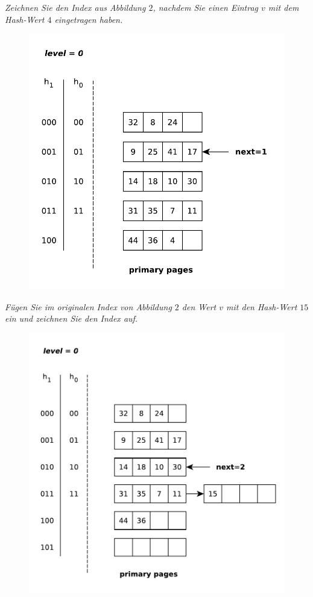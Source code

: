 \documentclass{uni_tue_template}
\begin{document}
  \item \emph{Zeichnen Sie den Index aus Abbildung $2$, nachdem Sie einen Eintrag $v$ mit dem Hash-Wert $4$ eingetragen haben.}
  \begin{figure}[h!]
    \centering
    \includegraphics[scale=0.7]{graphml/02_2.pdf}
  \end{figure}
  \newpage
  \item \emph{Fügen Sie im originalen Index von Abbildung $2$ den Wert $v$ mit den Hash-Wert $15$ ein und zeichnen Sie den Index auf.}
  \begin{figure}[h!]
    \centering
    \includegraphics[scale=0.7]{graphml/02_3.pdf}
  \end{figure}
\end{document}
